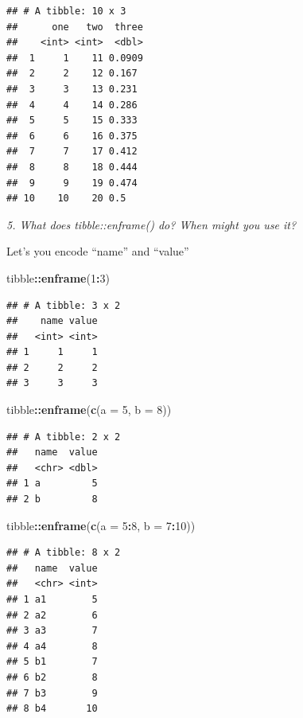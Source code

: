 \documentclass[]{book}
\newenvironment{Shaded}{\begin{snugshade}}{\end{snugshade}}
\newcommand{\DataTypeTok}[1]{\textcolor[rgb]{0.13,0.29,0.53}{#1}}
\newcommand{\DecValTok}[1]{\textcolor[rgb]{0.00,0.00,0.81}{#1}}
\newcommand{\KeywordTok}[1]{\textcolor[rgb]{0.13,0.29,0.53}{\textbf{#1}}}
\newcommand{\NormalTok}[1]{#1}
\newcommand{\OperatorTok}[1]{\textcolor[rgb]{0.81,0.36,0.00}{\textbf{#1}}}
\theoremstyle{definition}
\theoremstyle{definition}
\theoremstyle{definition}
\theoremstyle{remark}
\begin{document}
\begin{verbatim}
## # A tibble: 10 x 3
##      one   two  three
##    <int> <int>  <dbl>
##  1     1    11 0.0909
##  2     2    12 0.167 
##  3     3    13 0.231 
##  4     4    14 0.286 
##  5     5    15 0.333 
##  6     6    16 0.375 
##  7     7    17 0.412 
##  8     8    18 0.444 
##  9     9    19 0.474 
## 10    10    20 0.5
\end{verbatim}

\emph{5. What does tibble::enframe() do? When might you use it?}

Let's you encode ``name'' and ``value''

\begin{Shaded}
\begin{Highlighting}[]
\NormalTok{tibble}\OperatorTok{::}\KeywordTok{enframe}\NormalTok{(}\DecValTok{1}\OperatorTok{:}\DecValTok{3}\NormalTok{)}
\end{Highlighting}
\end{Shaded}

\begin{verbatim}
## # A tibble: 3 x 2
##    name value
##   <int> <int>
## 1     1     1
## 2     2     2
## 3     3     3
\end{verbatim}

\begin{Shaded}
\begin{Highlighting}[]
\NormalTok{tibble}\OperatorTok{::}\KeywordTok{enframe}\NormalTok{(}\KeywordTok{c}\NormalTok{(}\DataTypeTok{a =} \DecValTok{5}\NormalTok{, }\DataTypeTok{b =} \DecValTok{8}\NormalTok{))}
\end{Highlighting}
\end{Shaded}

\begin{verbatim}
## # A tibble: 2 x 2
##   name  value
##   <chr> <dbl>
## 1 a         5
## 2 b         8
\end{verbatim}

\begin{Shaded}
\begin{Highlighting}[]
\NormalTok{tibble}\OperatorTok{::}\KeywordTok{enframe}\NormalTok{(}\KeywordTok{c}\NormalTok{(}\DataTypeTok{a =} \DecValTok{5}\OperatorTok{:}\DecValTok{8}\NormalTok{, }\DataTypeTok{b =} \DecValTok{7}\OperatorTok{:}\DecValTok{10}\NormalTok{))}
\end{Highlighting}
\end{Shaded}

\begin{verbatim}
## # A tibble: 8 x 2
##   name  value
##   <chr> <int>
## 1 a1        5
## 2 a2        6
## 3 a3        7
## 4 a4        8
## 5 b1        7
## 6 b2        8
## 7 b3        9
## 8 b4       10
\end{verbatim}
\end{document}

